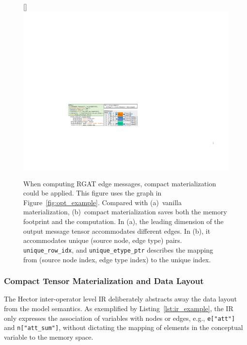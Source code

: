 \begin{figure}[!htbp]
[\linewidth]{\includegraphics[scale=1.45]{figures/Hector/supplemental_compact.final.down.pdf}}
\caption{\label{fig:compact_opt_opt} When computing RGAT edge messages, compact materialization could be applied. This figure uses the graph in Figure~\ref{fig:opt_example}. Compared with (a)~vanilla materialization, (b)~compact materialization saves both the memory footprint and the computation. In (a), the leading dimension of the output message tensor accommodates different edges. In (b), it accommodates unique (source node, edge type) pairs. \texttt{unique\_row\_idx}, and \texttt{unique\_etype\_ptr} describes the mapping from (source node index, edge type index) to the unique index.}
\end{figure}

\subsubsection{Compact Tensor Materialization and Data Layout}
\label{sec:materialization}

{The} Hector inter-operator level IR deliberately abstracts away the data layout from the model semantics. As exemplified by Listing~\ref{lst:ir_example}, the IR only expresses the association of variables with nodes or edges, e.g., \texttt{e["att"]} and \texttt{n["att\_sum"]}, without dictating the mapping of elements in the conceptual variable to the memory space. 

